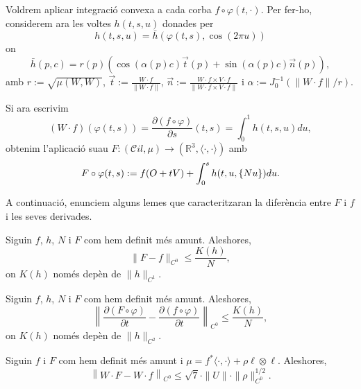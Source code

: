 Voldrem aplicar integració convexa a cada corba $f\circ\varphi(t,\cdot)$. Per fer-ho, considerem ara les voltes $h(t,s,u)$ donades per
\begin{equation}
    h(t,s,u) = \bar h(\varphi(t,s), \cos(2\pi u))
\end{equation}
on 
\begin{equation*}
    \bar h(p, c) = r(p)\left( \cos(\alpha(p)c)\vec t(p) + \sin(\alpha(p)c)\vec n(p) \right),
\end{equation*}
amb $r:=\sqrt{\mu(W,W)}$, $\vec t := \frac{W\cdot f}{\|W\cdot f\|}$, $\vec n := \frac{W\cdot f\times V\cdot f}{\|W\cdot f\times V\cdot f\|}$ i $\alpha:= J_0^{-1}(\|W\cdot f\|/r)$.

Si ara escrivim 
\begin{equation*}
    (W\cdot f)(\varphi(t,s)) = \frac{\partial(f\circ\varphi)}{\partial s}(t,s)= \int_0^1 h(t,s,u) du,
\end{equation*}
obtenim l'aplicació suau $F:(\mathcal Cil, \mu)\to(\mathbb R^3, \langle\cdot, \cdot\rangle)$ amb
\begin{equation}
    F\circ\varphi(t,s) := f(O+tV) + \int_0^s h(t,u,\{Nu\}) du.
\end{equation}

A continuació, enunciem alguns lemes que caracteritzaran la diferència entre $F$ i $f$ i les seves derivades.

\begin{lema}
    \label{lema:lema2}
    Siguin $f$, $h$, $N$ i $F$ com hem definit més amunt. Aleshores,
    \begin{equation*}
        \|F-f\|_{C^0} \le \frac{K(h)}{N},
    \end{equation*}
    on $K(h)$ només depèn de $\|h\|_{C^1}$.
\end{lema}

\begin{lema}
    \label{lema:lema3}
    Siguin $f$, $h$, $N$ i $F$ com hem definit més amunt. Aleshores,
    \begin{equation*}
        \left\|\frac{\partial (F\circ \varphi)}{\partial t}-\frac{\partial (f\circ \varphi)}{\partial t}\right\|_{C^0} \le \frac{K(h)}{N},
    \end{equation*}
    on $K(h)$ només depèn de $\|h\|_{C^2}$.
\end{lema}

\begin{lema}
    \label{lema:lema4}
    Siguin $f$ i $F$ com hem definit més amunt i $\mu = f^*\langle\cdot, \cdot\rangle + \rho\ell\otimes\ell$. Aleshores,
    \begin{equation*}
        \left\|W\cdot F-W\cdot f\right\|_{C^0} \le \sqrt7\cdot\|U\|\cdot\|\rho\|^{1/2}_{C^0}.
    \end{equation*}
\end{lema}

